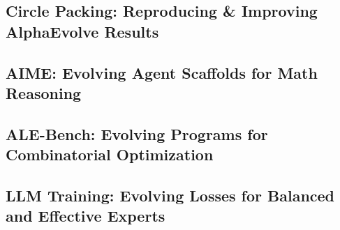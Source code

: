\subsection{Circle Packing: Reproducing \& Improving AlphaEvolve Results}



\newpage
\subsection{AIME: Evolving Agent Scaffolds for Math Reasoning}



\newpage
\subsection{ALE-Bench: Evolving Programs for Combinatorial Optimization}



\newpage
\subsection{LLM Training: Evolving Losses for Balanced and Effective Experts}



